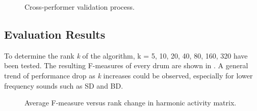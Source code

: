 \documentclass{article}
\begin{document}
\begin{figure}
 \centerline{}
 \caption{Cross-performer validation process.}
 \label{fig:cross}
\end{figure}

\subsection{Evaluation Results}\label{subsec:evaluation results}

To determine the rank {\itshape k} of the algorithm, k = {5, 10, 20, 40, 80, 160, 320} have been tested. The resulting F-measures of every drum are shown in . A general trend of performance drop as {\itshape k} increases could be observed, especially for lower frequency sounds such as SD and BD.   

\begin{figure}
 \centerline{}
 \caption{Average F-measure versus rank change in harmonic activity matrix.}
 \label{fig:rankTest}
\end{figure}
\end{document}
